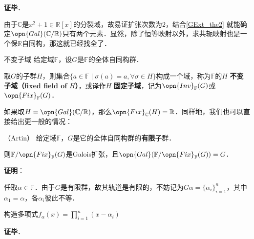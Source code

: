\textbf{证毕}．



由于$\mathbb{C}$是$x^2+1\in\mathbb{R}[x]$的分裂域，故易证扩张次数为$2$，结合\autoref{GExt_the2} 就能确定$\opn{Gal}(\mathbb{C}/\mathbb{R})$只有两个元素．显然，除了恒等映射以外，求共轭映射也是一个保$\mathbb{R}$自同构，那这就已经找全了．




\begin{definition}{不变子域}
给定域$\mathbb{F}$，设$G$是$\mathbb{F}$的全体自同构群．

取$G$的子群$H$，则集合$\{a\in\mathbb{F}\mid \sigma(a)=a, \forall \sigma\in H\}$构成一个域，称为$\mathbb{F}$的$H$ \textbf{不变子域（fixed field of }$H$\textbf{）}，或译作$H$ \textbf{固定子域}，记为$\opn{Inv}_\mathbb{F}(G)$或$\opn{Fix}_\mathbb{F}(G)$．
\end{definition}

如果取$H=\opn{Gal}(\mathbb{C}/\mathbb{R})$，那么$\opn{Fix}_{\mathbb{C}}(H)=\mathbb{R}$．同样地，我们也可以直接给出更一般的情况：



\begin{theorem}{（Artin）}
给定域$\mathbb{F}$，$G$是它的全体自同构群的\textbf{有限}子群．

则$\mathbb{F}/\opn{Fix}_\mathbb{F}(G)$是Galois扩张，且$\opn{Gal}(\mathbb{F}/\opn{Fix}_\mathbb{F}(G))=G$．
\end{theorem}

\textbf{证明}：

任取$\alpha\in\mathbb{F}$．由于$G$是有限群，故其轨道是有限的，不妨记为$G\alpha=\{\alpha_i\}_{i=1}^n$，其中$\alpha_1=\alpha$，各$\alpha_i$彼此不等．

构造多项式$f_\alpha(x)=\prod_{i=1}^n(x-\alpha_i)$

\textbf{证毕}．





